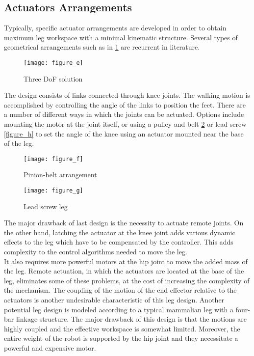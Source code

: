 \subsection{Actuators Arrangements}
Typically, specific actuator arrangements are developed in order to obtain maximum leg workspace with a minimal kinematic structure. Several types of geometrical arrangements such as in \ref{figure_e} are recurrent in literature.

\begin{figure}[h]
	\centering
	\texttt{[image: figure\_e]}
	\caption{Three DoF solution}
	\label{figure_e}
\end{figure}

The design consists of links connected through knee joints. The walking motion is accomplished by controlling the angle of the links to position the feet. There are a number of different ways in which the joints can be actuated. Options include mounting the motor at the joint itself, or using a pulley and belt \ref{figure_f} or lead screw \ref{figure_h} to set the angle of the knee using an actuator mounted near the base of the leg.

\begin{figure}[h]
	\centering
	\texttt{[image: figure\_f]}
	\caption{Pinion-belt arrangement}
	\label{figure_f}
\end{figure}

\begin{figure}[h]
	\centering
	\texttt{[image: figure\_g]}
	\caption{Lead screw leg}
	\label{figure_g}
\end{figure}

The major drawback of last design is the necessity to actuate remote joints. On the other hand, latching the actuator at the knee joint adds various dynamic effects to the leg which have to be compensated by the controller. This adds complexity to the control algorithms needed to move the leg.\\
It also requires more powerful motors at the hip joint to move the added mass of the leg. Remote actuation, in which the actuators are located at the base of the leg, eliminates some of these problems, at the cost of increasing the complexity of the mechanism. The coupling of the motion of the end effector relative to the actuators is another undesirable characteristic of this leg design.  Another potential leg design is modeled according to a typical mammalian leg with a four-bar linkage structure. The major drawback of this design is that the motions are highly coupled and the effective workspace is somewhat limited. Moreover, the entire weight of the robot is supported by the hip joint and they necessitate a powerful and expensive motor.

